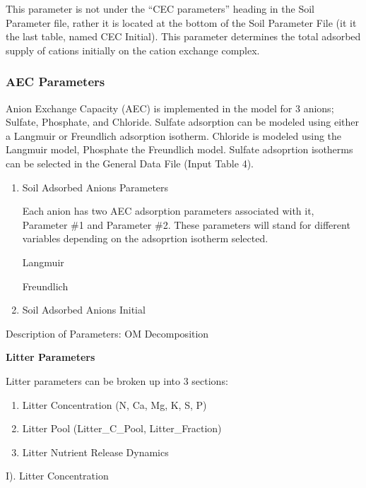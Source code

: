 \documentclass[
]{article}
\providecommand{\tightlist}{%
  \setlength{\itemsep}{0pt}\setlength{\parskip}{0pt}}
\begin{document}
\begin{enumerate}
  This parameter is not under the ``CEC parameters'' heading in the Soil
  Parameter file, rather it is located at the bottom of the Soil
  Parameter File (it it the last table, named CEC Initial). This
  parameter determines the total adsorbed supply of cations initially on
  the cation exchange complex.

  \hypertarget{aec-parameters}{%
  \subsubsection{AEC Parameters}\label{aec-parameters}}

  Anion Exchange Capacity (AEC) is implemented in the model for 3
  anions; Sulfate, Phosphate, and Chloride. Sulfate adsorption can be
  modeled using either a Langmuir or Freundlich adsorption isotherm.
  Chloride is modeled using the Langmuir model, Phosphate the Freundlich
  model. Sulfate adsoprtion isotherms can be selected in the General
  Data File (Input Table 4).

  \begin{enumerate}
  \def\labelenumii{\arabic{enumii}.}
  \item
    Soil Adsorbed Anions Parameters

    Each anion has two AEC adsorption parameters associated with it,
    Parameter \#1 and Parameter \#2. These parameters will stand for
    different variables depending on the adsoprtion isotherm selected.

    Langmuir

    Freundlich
  \item
    Soil Adsorbed Anions Initial
  \end{enumerate}
\end{enumerate}

Description of Parameters: OM Decomposition

\textbf{Litter Parameters}

Litter parameters can be broken up into 3 sections:

\begin{enumerate}
\def\labelenumi{\arabic{enumi}.}
\tightlist
\item
  Litter Concentration (N, Ca, Mg, K, S, P)
\item
  Litter Pool (Litter\_C\_Pool, Litter\_Fraction)
\item
  Litter Nutrient Release Dynamics
\end{enumerate}

I). Litter Concentration
\end{document}
